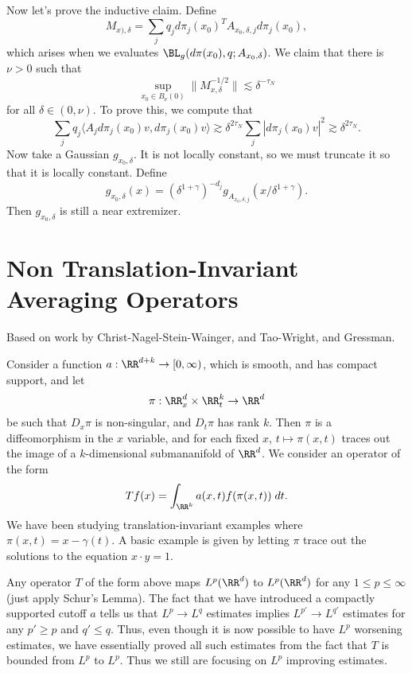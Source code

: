 Now let's prove the inductive claim. Define
%
\[ M_{x),\delta} = \sum_j q_j d\pi_j(x_0)^T A_{x_0, \delta,j} d\pi_j(x_0), \]
%
which arises when we evaluates $\BL_g(d\pi(x_0), q; A_{x_0,\delta})$. We claim that there is $\nu > 0$ such that
%
\[ \sup_{x_0 \in B_\nu(0)} \| M_{x,\delta}^{-1/2} \| \lesssim \delta^{-\tau_N} \]
%
for all $\delta \in (0,\nu)$. To prove this, we compute that
%
\[ \sum_j q_j \langle A_j d\pi_j(x_0) v, d\pi_j(x_0) v \rangle \gtrsim \delta^{2 \tau_N} \sum_j |d\pi_j(x_0) v|^2 \gtrsim \delta^{2 \tau_N}. \]
%
Now take a Gaussian $g_{x_0,\delta}$. It is not locally constant, so we must truncate it so that it is locally constant. Define
%
\[ g_{x_0,\delta}(x) = (\delta^{1 + \gamma})^{-d_j} g_{A_{x_0,\delta,j}}(x / \delta^{1 + \gamma}). \]
%
Then $g_{x_0,\delta}$ is still a near extremizer.









\section{Non Translation-Invariant Averaging Operators}

Based on work by Christ-Nagel-Stein-Wainger, and Tao-Wright, and Gressman.

Consider a function $a: \RR^{d+k} \to [0,\infty)$, which is smooth, and has compact support, and let
%
\[ \pi: \RR^d_x \times \RR^k_t \to \RR^d \]
%
be such that $D_x \pi$ is non-singular, and $D_t \pi$ has rank $k$. Then $\pi$ is a diffeomorphism in the $x$ variable, and for each fixed $x$, $t \mapsto \pi(x,t)$ traces out the image of a $k$-dimensional submananifold of $\RR^d$. We consider an operator of the form
%
\[ Tf(x) = \int_{\RR^k} a(x,t) f(\pi(x,t))\; dt. \]
%
We have been studying translation-invariant examples where $\pi(x,t) = x - \gamma(t)$. A basic example is given by letting $\pi$ trace out the solutions to the equation $x \cdot y = 1$.

Any operator $T$ of the form above maps $L^p(\RR^d)$ to $L^p(\RR^d)$ for any $1 \leq p \leq \infty$ (just apply Schur's Lemma). The fact that we have introduced a compactly supported cutoff $a$ tells us that $L^p \to L^q$ estimates implies $L^{p'} \to L^{q'}$ estimates for any $p' \geq p$ and $q' \leq q$. Thus, even though it is now possible to have $L^p$ worsening estimates, we have essentially proved all such estimates from the fact that $T$ is bounded from $L^p$ to $L^p$. Thus we still are focusing on $L^p$ improving estimates.

